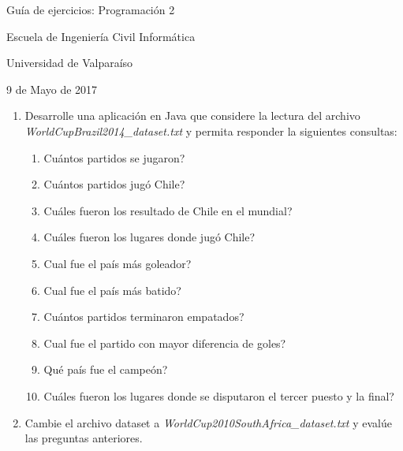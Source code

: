 \documentclass{article}
\begin{document}
	\centerline{\sc \large Gu\'ia de ejercicios: Programaci\'on 2}
	\centerline{\sc \normalsize Escuela de Ingenier\'ia Civil Inform\'atica}
	\centerline{\sc \normalsize  Universidad de Valpara\'iso}
	\centerline{\sc \small 9 de Mayo de 2017}

	\vspace{1pc}

	\begin{enumerate}
	    \item[] Desarrolle una aplicaci\'on en Java que considere la lectura del archivo \emph{WorldCupBrazil2014\_dataset.txt} y permita responder la siguientes consultas:
	    \begin{enumerate}
	        \item \textquestiondown Cu\'antos partidos se jugaron?
	        \item \textquestiondown Cu\'antos partidos jug\'o Chile?
	        \item \textquestiondown Cu\'ales fueron los resultado de Chile en el mundial?
	        \item \textquestiondown Cu\'ales fueron los lugares donde jug\'o Chile?
	        \item \textquestiondown Cual fue el pa\'is m\'as goleador?
	        \item \textquestiondown Cual fue el pa\'is m\'as batido?
	        \item \textquestiondown Cu\'antos partidos terminaron empatados?
	        \item \textquestiondown Cual fue el partido con mayor diferencia de goles?
	        \item \textquestiondown Qu\'e pa\'is fue el campe\'on?
	        \item \textquestiondown Cu\'ales fueron los lugares donde se disputaron el tercer puesto y la final?
	    \end{enumerate}
	    \item[] Cambie el archivo dataset a \emph{WorldCup2010SouthAfrica\_dataset.txt} y eval\'ue las preguntas anteriores.
	\end{enumerate}
\end{document}
